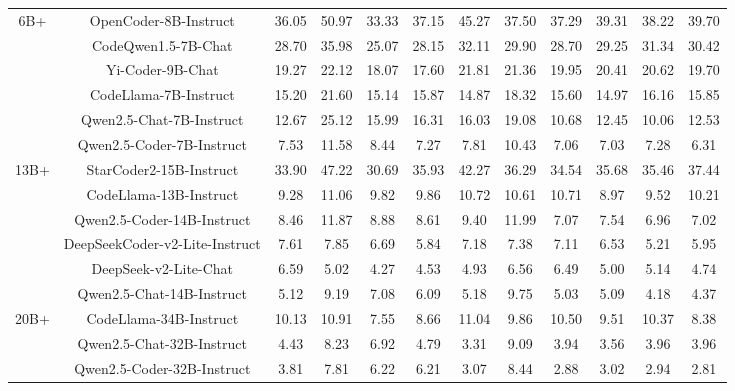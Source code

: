 \documentclass[11pt, a4paper, logo, copyright, nonumbering, amsart]{map}
\begin{document}
\begin{CJK*}{UTF8}{gbsn}
\begin{table*}[h!]
\begin{adjustbox}{width=\textwidth}
\begin{tabular}{c|c|cccccccccc}
    \midrule
    \multirow{6}{*}{6B+} 
    & OpenCoder-8B-Instruct & 36.05 & 50.97 & 33.33 & 37.15 & 45.27 & 37.50 & 37.29 & 39.31 & 38.22 & 39.70 \\
    & CodeQwen1.5-7B-Chat & 28.70 & 35.98 & 25.07 & 28.15 & 32.11 & 29.90 & 28.70 & 29.25 & 31.34 & 30.42 \\
    & Yi-Coder-9B-Chat & 19.27 & 22.12 & 18.07 & 17.60 & 21.81 & 21.36 & 19.95 & 20.41 & 20.62 & 19.70 \\
    & CodeLlama-7B-Instruct & 15.20 & 21.60 & 15.14 & 15.87 & 14.87 & 18.32 & 15.60 & 14.97 & 16.16 & 15.85 \\
    & Qwen2.5-Chat-7B-Instruct & 12.67 & 25.12 & 15.99 & 16.31 & 16.03 & 19.08 & 10.68 & 12.45 & 10.06 & 12.53 \\
    & Qwen2.5-Coder-7B-Instruct & 7.53 & 11.58 & 8.44 & 7.27 & 7.81 & 10.43 & 7.06 & 7.03 & 7.28 & 6.31 \\
    
    \midrule
    \multirow{6}{*}{13B+} 
    & StarCoder2-15B-Instruct & 33.90 & 47.22 & 30.69 & 35.93 & 42.27 & 36.29 & 34.54 & 35.68 & 35.46 & 37.44 \\
    & CodeLlama-13B-Instruct & 9.28 & 11.06 & 9.82 & 9.86 & 10.72 & 10.61 & 10.71 & 8.97 & 9.52 & 10.21 \\
    & Qwen2.5-Coder-14B-Instruct & 8.46 & 11.87 & 8.88 & 8.61 & 9.40 & 11.99 & 7.07 & 7.54 & 6.96 & 7.02 \\
    & DeepSeekCoder-v2-Lite-Instruct & 7.61 & 7.85 & 6.69 & 5.84 & 7.18 & 7.38 & 7.11 & 6.53 & 5.21 & 5.95 \\
    & DeepSeek-v2-Lite-Chat & 6.59 & 5.02 & 4.27 & 4.53 & 4.93 & 6.56 & 6.49 & 5.00 & 5.14 & 4.74 \\
    & Qwen2.5-Chat-14B-Instruct & 5.12 & 9.19 & 7.08 & 6.09 & 5.18 & 9.75 & 5.03 & 5.09 & 4.18 & 4.37 \\
    
    \midrule
    \multirow{3}{*}{20B+}
    & CodeLlama-34B-Instruct & 10.13 & 10.91 & 7.55 & 8.66 & 11.04 & 9.86 & 10.50 & 9.51 & 10.37 & 8.38 \\
    & Qwen2.5-Chat-32B-Instruct & 4.43 & 8.23 & 6.92 & 4.79 & 3.31 & 9.09 & 3.94 & 3.56 & 3.96 & 3.96 \\
    & Qwen2.5-Coder-32B-Instruct & 3.81 & 7.81 & 6.22 & 6.21 & 3.07 & 8.44 & 2.88 & 3.02 & 2.94 & 2.81 \\
    

\end{tabular}
\end{adjustbox}
\end{table*}
\end{CJK*}
\end{document}
